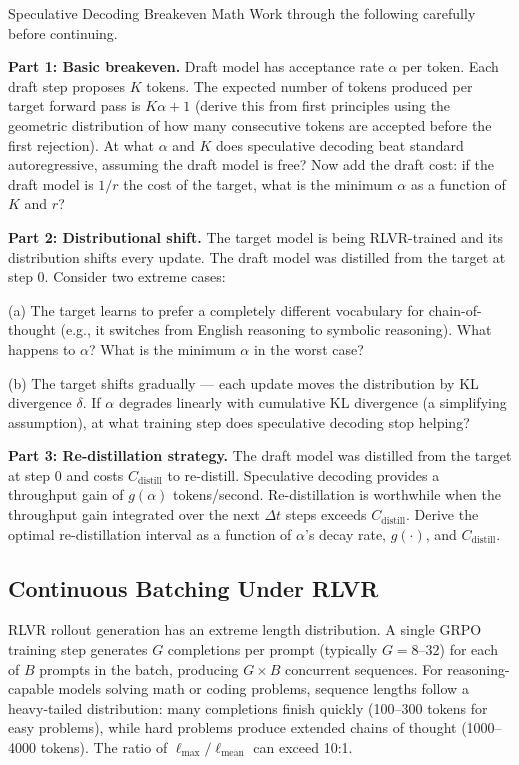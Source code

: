 \begin{thinkfirst}{Speculative Decoding Breakeven Math}
Work through the following carefully before continuing.

\textbf{Part 1: Basic breakeven.} Draft model has acceptance rate $\alpha$ per token. Each draft step proposes $K$ tokens. The expected number of tokens produced per target forward pass is $K\alpha + 1$ (derive this from first principles using the geometric distribution of how many consecutive tokens are accepted before the first rejection). At what $\alpha$ and $K$ does speculative decoding beat standard autoregressive, assuming the draft model is free? Now add the draft cost: if the draft model is $1/r$ the cost of the target, what is the minimum $\alpha$ as a function of $K$ and $r$?

\textbf{Part 2: Distributional shift.} The target model is being RLVR-trained and its distribution shifts every update. The draft model was distilled from the target at step 0. Consider two extreme cases:

(a) The target learns to prefer a completely different vocabulary for chain-of-thought (e.g., it switches from English reasoning to symbolic reasoning). What happens to $\alpha$? What is the minimum $\alpha$ in the worst case?

(b) The target shifts gradually --- each update moves the distribution by KL divergence $\delta$. If $\alpha$ degrades linearly with cumulative KL divergence (a simplifying assumption), at what training step does speculative decoding stop helping?

\textbf{Part 3: Re-distillation strategy.} The draft model was distilled from the target at step 0 and costs $C_\text{distill}$ to re-distill. Speculative decoding provides a throughput gain of $g(\alpha)$ tokens/second. Re-distillation is worthwhile when the throughput gain integrated over the next $\Delta t$ steps exceeds $C_\text{distill}$. Derive the optimal re-distillation interval as a function of $\alpha$'s decay rate, $g(\cdot)$, and $C_\text{distill}$.
\end{thinkfirst}

\subsection{Continuous Batching Under RLVR}

RLVR rollout generation has an extreme length distribution. A single GRPO training step generates $G$ completions per prompt (typically $G = 8$--$32$) for each of $B$ prompts in the batch, producing $G \times B$ concurrent sequences. For reasoning-capable models solving math or coding problems, sequence lengths follow a heavy-tailed distribution: many completions finish quickly (100--300 tokens for easy problems), while hard problems produce extended chains of thought (1000--4000 tokens). The ratio of $\ell_\text{max} / \ell_\text{mean}$ can exceed 10:1.

